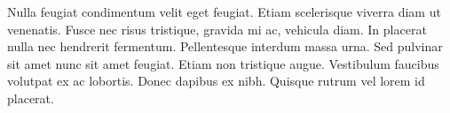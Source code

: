 Nulla feugiat condimentum velit eget feugiat. Etiam scelerisque viverra diam ut venenatis. Fusce nec risus tristique, gravida mi ac, vehicula diam. In placerat nulla nec hendrerit fermentum. Pellentesque interdum massa urna. Sed pulvinar sit amet nunc sit amet feugiat. Etiam non tristique augue. Vestibulum faucibus volutpat ex ac lobortis. Donec dapibus ex nibh. Quisque rutrum vel lorem id placerat.


